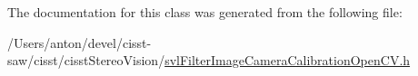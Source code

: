 The documentation for this class was generated from the following file\+:\begin{DoxyCompactItemize}
\item 
/\+Users/anton/devel/cisst-\/saw/cisst/cisst\+Stereo\+Vision/\hyperlink{svl_filter_image_camera_calibration_open_c_v_8h}{svl\+Filter\+Image\+Camera\+Calibration\+Open\+C\+V.\+h}\end{DoxyCompactItemize}
